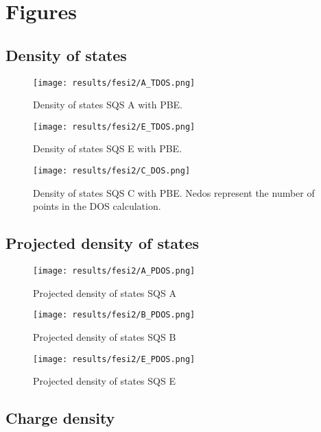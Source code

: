 \chapter{Figures}
\label{appendix:equi}

\section{Density of states}

\begin{figure}[H]
	\centering
	\texttt{[image: results/fesi2/A\_TDOS.png]}
	\caption{Density of states SQS A  with PBE.}
\end{figure}

\begin{figure}[H]
	\centering
	\texttt{[image: results/fesi2/E\_TDOS.png]}
	\caption{Density of states SQS E  with PBE.}
\end{figure}

\begin{figure}[H]
	\centering
	\texttt{[image: results/fesi2/C\_DOS.png]}
	\caption{Density of states SQS C  with PBE. Nedos represent the number of points in the DOS calculation.}
\end{figure}


\section{Projected density of states}

\begin{figure}[H]
\texttt{[image: results/fesi2/A\_PDOS.png]}
\caption{Projected density of states SQS A}
\end{figure}

\begin{figure}[H]
\texttt{[image: results/fesi2/B\_PDOS.png]}
\caption{Projected density of states SQS B}
\end{figure}

\begin{figure}[H]
\texttt{[image: results/fesi2/E\_PDOS.png]}
\caption{Projected density of states SQS E}
\end{figure}

\section{Charge density}

